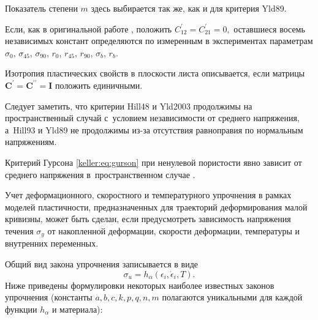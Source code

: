 Показатель степени $m$ здесь выбирается так же, как и для критерия {\small\sc Yld89}. 

Если, как в оригинальной работе \cite{keller:bib:barlat2003}, положить $C_{12}^{\prime}=C_{21}^{\prime}=0,$  оставшиеся восемь независимых констант определяются по измеренным в экспериментах параметрам $\sigma_0$, $\sigma_{45}$, $\sigma_{90}$, $r_0$, $r_{45}$, $r_{90}$, $\sigma_b$, $r_b.$ 

Изотропия пластических свойств в плоскости листа описывается, если матрицы $\boldsymbol{C}^{\prime}=\boldsymbol{C}^{\prime\prime}=\boldsymbol{I}$ положить единичными. 








Следует заметить, что критерии {\small\sc Hill48} и {\small\sc Yld2003} продолжимы на пространственный случай с~условием независимости от среднего напряжения, а~{\small\sc Hill93} и {\small\sc Yld89} не продолжимы из-за отсутствия равноправия по нормальным напряжениям. 

Критерий Гурсона \eqref{keller:eq:gurson} при ненулевой пористости явно зависит от среднего напряжения в~пространственном случае \cite{keller:bib:barlat1997}. 





Учет деформационного, скоростного и температурного упрочнения в рамках моделей пластичности, предназначенных для траекторий деформирования малой кривизны, может быть сделан, если предусмотреть зависимость напряжения течения $\sigma_y$ от накопленной деформации, скорости деформации, температуры и внутренних переменных. 



Общий вид закона упрочнения записывается в виде $$\sigma_u=h_{\alpha}(\epsilon_i,\dot{\epsilon}_i,T).$$ Ниже приведены формулировки некоторых наиболее известных законов упрочнения (константы $a,b,c,k,p,q,n,m$ полагаются уникальными для каждой функции $h_{\alpha}$ и материала):



